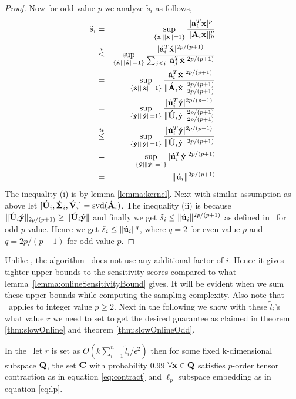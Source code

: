 \begin{proof}{\label{proof:slowOnlineSensitivityBound}}
  Now for odd value $p$ we analyze $\tilde{s}_{i}$ as follows,
 \begin{eqnarray*}
  \tilde{s}_{i} &=& \sup_{\{\mathbf{x}\mid\|\mathbf{x}\|=1\}}\frac{|\mathbf{a}_{i}^{T}\mathbf{x}|^{p}}{\|\mathbf{A}_{i}\mathbf{x}\|_{p}^{p}}\\
  &\stackrel{i}{\leq}& \sup_{\{\acute{\mathbf{x}}\mid\|\acute{\mathbf{x}}\|=1\}}\frac{|\acute{\mathbf{a}}_{i}^{T}\acute{\mathbf{x}}|^{2p/(p+1)}}{\sum_{j\leq i}|\acute{\mathbf{a}}_{j}^{T}\acute{\mathbf{x}}|^{2p/(p+1)}} \\
  &=& \sup_{\{\acute{\mathbf{x}}\mid\|\acute{\mathbf{x}}\|=1\}}\frac{|\acute{\mathbf{a}}_{i}^{T}\acute{\mathbf{x}}|^{2p/(p+1)}} {\|\acute{\mathbf{A}}_{i}\acute{\mathbf{x}}\|_{2p/(p+1)}^{2p/(p+1)}} \\
  &=& \sup_{\{\acute{\mathbf{y}}\mid\|\acute{\mathbf{y}}\|=1\}}\frac{|\acute{\mathbf{u}}_{i}^{T}\acute{\mathbf{y}}|^{2p/(p+1)}} {\|\acute{\mathbf{U}}_{i}\acute{\mathbf{y}}\|_{2p/(p+1)}^{2p/(p+1)}} \\
  &\stackrel{ii}{\leq}& \sup_{\{\acute{\mathbf{y}}\mid\|\acute{\mathbf{y}}\|=1\}}\frac{|\acute{\mathbf{u}}_{i}^{T}\acute{\mathbf{y}}|^{2p/(p+1)}} {\|\acute{\mathbf{U}}_{i}\acute{\mathbf{y}}\|^{2p/(p+1)}} \\ 
  &=& \sup_{\{\acute{\mathbf{y}}\mid\|\acute{\mathbf{y}}\|=1\}}|\acute{\mathbf{u}}_{i}^{T}\acute{\mathbf{y}}|^{2p/(p+1)} \\
  &=& \|\acute{\mathbf{u}}_{i}\|^{2p/(p+1)} 
 \end{eqnarray*}
 The inequality (i) is by lemma \ref{lemma:kernel}. Next with similar assumption as above let $[\acute{\mathbf{U}}_{i},\acute{\mathbf{\Sigma}}_{i},\acute{\mathbf{V}}_{i}]=\mbox{svd}(\acute{\mathbf{A}}_{i})$. The inequality (ii) is because $\|\acute{\mathbf{U}}_{i}\acute{\mathbf{y}}\|_{2p/(p+1)} \geq \|\acute{\mathbf{U}}_{i}\acute{\mathbf{y}}\|$ and finally we get $\tilde{s}_{i} \leq \|\acute{\mathbf{u}}_{i}\|^{2p/(p+1)}$ as defined in ~for odd $p$ value. Hence we get $\tilde{s}_{i} \leq \|\acute{\mathbf{u}}_{i}\|^{q}$, where $q = 2$ for even value $p$ and $q = 2p/(p+1)$ for odd value $p$.
\end{proof}
% 
Unlike \online, the algorithm ~does not use any additional factor of $i$. Hence it gives tighter upper bounds to the sensitivity scores compared to what lemma~\ref{lemma:onlineSensitivityBound} gives. It will be evident when we sum these upper bounds while computing the sampling complexity. Also note that ~applies to integer value $p \geq 2$. Next in the following we show with these $\tilde{l}_{i}$'s what value $r$ we need to set to get the desired guarantee as claimed in theorem \ref{thm:slowOnline} and theorem \ref{thm:slowOnlineOdd}.
% 
\begin{lemma}{\label{lemma:slowOnlineGuarantee}}
 In the ~let $r$ is set as $O(k\sum_{i=1}^{n}\tilde{l}_{i}/\epsilon^{2})$ then for some fixed k-dimensional subspace $\mathbf{Q}$, the set $\mathbf{C}$ with probability $0.99$ $\forall \mathbf{x} \in \mathbf{Q}$ satisfies $p$-order tensor contraction as in equation \eqref{eq:contract} and $\ell_{p}$ subspace embedding as in equation \eqref{eq:lp}.
\end{lemma}
